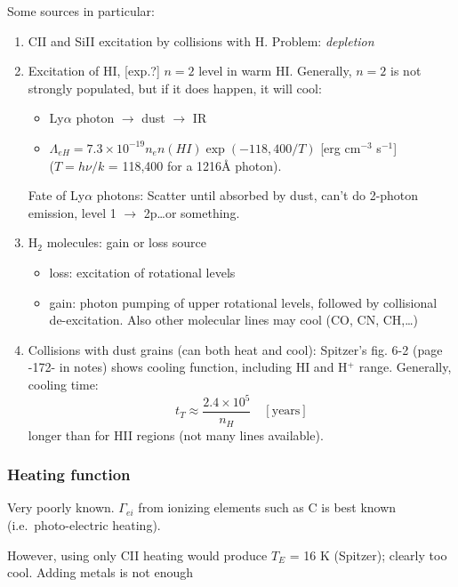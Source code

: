 \documentclass[12pt]{article}
\newcommand{\mar}[1]{\hspace{0pt}\marginpar{-\textcolor{black}{#1}-}}
\newcommand{\mynotes}[1]{\textcolor{mygreen}{#1}}
\begin{document}
\mar{161}Some sources in particular:
\begin{enumerate}
    \item CII and SiII excitation by collisions with H. Problem: \emph{depletion}
    \item Excitation of HI, [exp.?] $n=2$ level in warm HI.
        Generally, $n=2$ is not strongly populated, but if it does happen,
        it will cool:
        \begin{itemize}[itemsep=0ex]
            \item Ly$\alpha$ photon $\rightarrow$ dust $\rightarrow$ IR
            \item $\Lambda_{eH} = 7.3\times10^{-19} n_{e}n(HI)
                \exp(-118,400/T) $ [erg cm$^{-3}$ s$^{-1}$]\\
                ($T = h\nu/k$ = 118,400 for a 1216\AA{} photon).
        \end{itemize}
        \mynotes{Fate of Ly$\alpha$ photons: Scatter until absorbed by dust,
        can't do 2-photon emission, level 1 $\rightarrow$ 2p\ldots or something.}
    \item H$_{2}$ molecules: gain or loss source
        \begin{itemize}
            \item loss: excitation of rotational levels
            \item gain: photon pumping of upper rotational levels, followed by
                collisional de-excitation.
                Also other molecular lines may cool (CO, CN, CH,\ldots)
        \end{itemize}
    \item Collisions with dust grains (can both heat and cool):
        Spitzer's fig. 6-2 (page -172- in notes) shows cooling function,
        including HI and H$^{+}$ range.
        Generally, cooling time:
        \[
            t_{T} \approx \frac{2.4\times10^{5}}{n_{H}} \quad [\mathrm{years}]
            \]
        longer than for HII regions \mynotes{(not many lines available)}.
\end{enumerate}

\subsubsection{Heating function}
Very poorly known. $\Gamma_{ei}$ from ionizing elements such as C is best
known (i.e.\ photo-electric heating).

\mar{162}However, using only CII heating would produce $T_{E}$ = 16 K
(Spitzer); clearly too cool. \mynotes{Adding metals is not enough}
\end{document}
